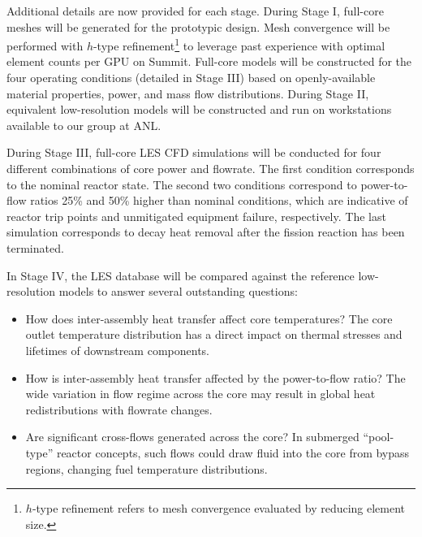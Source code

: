 Additional details are now provided for each stage. During Stage I, full-core meshes will be generated for the prototypic design. Mesh convergence will be performed with \(h\)-type refinement\footnote{$h$-type refinement refers to mesh convergence evaluated by reducing element size.} to leverage past experience with optimal element counts per GPU on Summit. Full-core models will be constructed for the four operating conditions (detailed in Stage III) based on openly-available material properties, power, and mass flow distributions. During Stage II, equivalent low-resolution models will be constructed and run on workstations available to our group at ANL. 

During Stage III, full-core LES CFD simulations will be conducted for four different combinations of core power and flowrate. The first condition corresponds to the nominal reactor state. The second two conditions correspond to power-to-flow ratios 25\% and 50\% higher than nominal conditions, which are indicative of reactor trip points \cite{chaumont} and unmitigated equipment failure, respectively. The last simulation corresponds to decay heat removal after the fission reaction has been terminated. 

In Stage IV, the LES database will be compared against the reference low-resolution models to answer several outstanding questions:

\vspace{-.15in}
\begin{itemize}
\item How does inter-assembly heat transfer affect core temperatures? The core outlet temperature distribution has a direct impact on thermal stresses and lifetimes of downstream components.
\item How is inter-assembly heat transfer affected by the power-to-flow ratio? The wide variation in flow regime across the core may result in global heat redistributions with flowrate changes. 
\item Are significant cross-flows generated across the core? In submerged ``pool-type'' reactor concepts, such flows could draw fluid into the core from bypass regions, changing fuel temperature distributions.
\end{itemize}
\vspace{-.15in}

